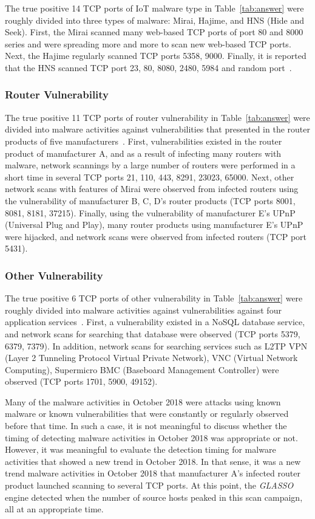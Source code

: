 \documentclass[conference]{IEEEtran}
\begin{document}
The true positive 14 TCP ports of IoT malware type in Table~\ref{tab:answer} were roughly divided into three types of malware: Mirai, Hajime, and HNS (Hide and Seek).
First, the Mirai scanned many web-based TCP ports of port 80 and 8000 series and were spreading more and more to scan new web-based TCP ports.
Next, the Hajime regularly scanned TCP ports 5358, 9000.
Finally, it is reported that the HNS scanned TCP port 23, 80, 8080, 2480, 5984 and random port~\cite{Netlab_HNS}.

\subsubsection{Router Vulnerability}

The true positive 11 TCP ports of router vulnerability in Table~\ref{tab:answer} were divided into malware activities against vulnerabilities that presented in the router products of five manufacturers~\cite{Huawei,Netlab_BCM,Netlab_MikroTik}.
First, vulnerabilities existed in the router product of manufacturer A, and as a result of infecting many routers with malware, network scannings by a large number of routers were performed in a short time in several TCP ports 21, 110, 443, 8291, 23023, 65000.
Next, other network scans with features of Mirai were observed from infected routers using the vulnerability of manufacturer B, C, D's router products (TCP ports 8001, 8081, 8181, 37215).
Finally, using the vulnerability of manufacturer E's UPnP (Universal Plug and Play), many router products using manufacturer E's UPnP were hijacked, and network scans were observed from infected routers (TCP port 5431).



\subsubsection{Other Vulnerability}
The true positive 6 TCP ports of other vulnerability in Table~\ref{tab:answer} were roughly divided into malware activities against vulnerabilities against four application services~\cite{Imperva}.
First, a vulnerability existed in a NoSQL database service, and network scans for searching that database were observed (TCP ports 5379, 6379, 7379).
In addition, network scans for searching services such as L2TP VPN (Layer 2 Tunneling Protocol Virtual Private Network), VNC (Virtual Network Computing), Supermicro BMC (Baseboard Management Controller) were observed (TCP ports 1701, 5900, 49152).


Many of the malware activities in October 2018 were attacks using known malware or known vulnerabilities that were constantly or regularly observed before that time.
In such a case, it is not meaningful to discuss whether the timing of detecting malware activities in October 2018 was appropriate or not.
However, it was meaningful to evaluate the detection timing for malware activities that showed a new trend in October 2018.
In that sense, it was a new trend malware activities in October 2018 that manufacturer A's infected router product launched scanning to several TCP ports.
At this point, the {\it GLASSO} engine detected when the number of source hosts peaked in this scan campaign, all at an appropriate time.
\end{document}

